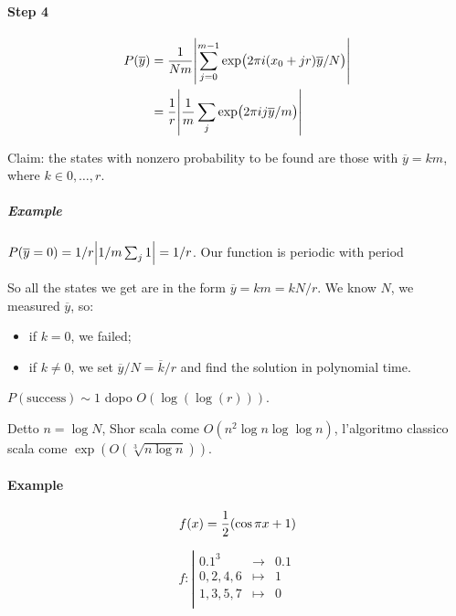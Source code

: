 \paragraph{Step 4}

\begin{subequations}
\begin{align}
  P(\overline{y})
  &= \frac{1}{Nm} \abs{\sum _{j=0} ^{m-1} \exp(2 \pi i (x_0 + jr) \overline{y}/N) }  \\
  &= \frac{1}{r} \abs{\frac{1}{m} \sum_j \exp(2 \pi i j \overline{y} /m)}
\end{align}
\end{subequations}

Claim: the states with nonzero probability to be found are those with \( \overline{y} = km \), where \( k \in 0, \dots,  r \).

\subparagraph{Example}

\( P(\overline{y} = 0) = 1/r \abs{1/m \sum_j 1} = 1/r \). Our function is periodic with period

So all the states we get are in the form \( \overline{y}=km = kN/r \). We know $N$, we measured \( \overline{y} \), so:

\begin{itemize}
  \item if \( k=0 \), we failed;
  \item if \( k\neq 0 \), we set \( \overline{y}/N = \overline{k}/r \) and find the solution in polynomial time.
\end{itemize}

\( P(\text{success}) \sim 1 \) dopo \( O(\log(\log(r))) \).

Detto \( n = \log N \), Shor scala come \( O(n^2 \log n \log \log n) \), l'algoritmo classico scala come \( \exp(O(\sqrt[3]{n\log n})) \).

\paragraph{Example}

\begin{equation}
  f(x) = \frac{1}{2} \qty(\cos \pi x + 1)
\end{equation}

\[
 f:
\left|
  \begin{array}{rcl}
    \qty{0,1}^3 & \longrightarrow & \qty{0,1} \\
    0,2,4,6 & \longmapsto & 1 \\
    1,3,5,7 & \longmapsto & 0 \\
  \end{array}
\right.
\]

